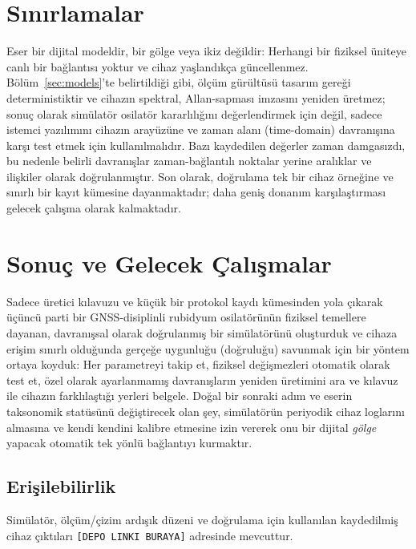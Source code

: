 \documentclass[conference]{IEEEtran}
\begin{document}
\section{Sınırlamalar}
Eser bir dijital modeldir, bir gölge veya ikiz değildir: Herhangi bir fiziksel üniteye canlı bir bağlantısı yoktur ve cihaz yaşlandıkça güncellenmez. Bölüm~\ref{sec:models}'te belirtildiği gibi, ölçüm gürültüsü tasarım gereği deterministiktir ve cihazın spektral, Allan-sapması imzasını yeniden üretmez; sonuç olarak simülatör osilatör kararlılığını değerlendirmek için değil, sadece istemci yazılımını cihazın arayüzüne ve zaman alanı (time-domain) davranışına karşı test etmek için kullanılmalıdır. Bazı kaydedilen değerler zaman damgasızdı, bu nedenle belirli davranışlar zaman-bağlantılı noktalar yerine aralıklar ve ilişkiler olarak doğrulanmıştır. Son olarak, doğrulama tek bir cihaz örneğine ve sınırlı bir kayıt kümesine dayanmaktadır; daha geniş donanım karşılaştırması gelecek çalışma olarak kalmaktadır.

\section{Sonuç ve Gelecek Çalışmalar}
Sadece üretici kılavuzu ve küçük bir protokol kaydı kümesinden yola çıkarak üçüncü parti bir GNSS-disiplinli rubidyum osilatörünün fiziksel temellere dayanan, davranışsal olarak doğrulanmış bir simülatörünü oluşturduk ve cihaza erişim sınırlı olduğunda gerçeğe uygunluğu (doğruluğu) savunmak için bir yöntem ortaya koyduk: Her parametreyi takip et, fiziksel değişmezleri otomatik olarak test et, özel olarak ayarlanmamış davranışların yeniden üretimini ara ve kılavuz ile cihazın farklılaştığı yerleri belgele. Doğal bir sonraki adım ve eserin taksonomik statüsünü değiştirecek olan şey, simülatörün periyodik cihaz loglarını almasına ve kendi kendini kalibre etmesine izin vererek onu bir dijital \emph{gölge} yapacak otomatik tek yönlü bağlantıyı kurmaktır.

\subsection*{Erişilebilirlik}
Simülatör, ölçüm/çizim ardışık düzeni ve doğrulama için kullanılan kaydedilmiş cihaz çıktıları
\texttt{[DEPO LINKI BURAYA]} adresinde mevcuttur.



\end{document}
